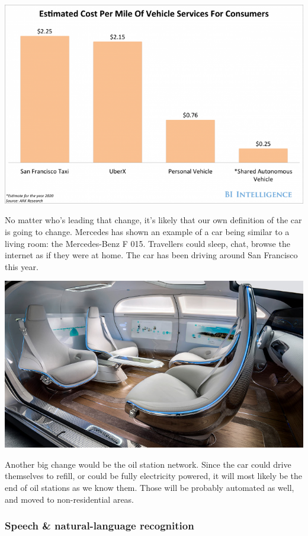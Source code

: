 \documentclass[12pt]{article}
\begin{document}
\medskip
\includegraphics[width=\textwidth]{vehicle-cost}
\smallskip

No matter who's leading that change, it's likely that our own definition of the
car is going to change. Mercedes has shown an example of a car being similar to
a living room: the Mercedes-Benz F 015. Travellers could sleep, chat, browse the
internet as if they were at home. The car has been driving around San Francisco
this year.

\smallskip
\includegraphics[width=\textwidth]{mercedes}
\smallskip

Another big change would be the oil station network. Since the car could drive
themselves to refill, or could be fully electricity powered, it will most likely
be the end of oil stations as we know them. Those will be probably automated as
well, and moved to non-residential areas.


\subsubsection{Speech \& natural-language recognition}
\end{document}
